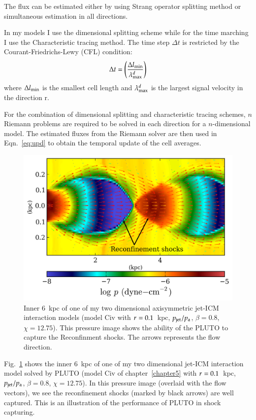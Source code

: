The flux can be estimated either by using Strang operator splitting method or simultaneous estimation in all directions. 

In my models I use the dimensional splitting scheme while for the time marching I use the Characteristic tracing method. The time step $\Delta t$ is restricted by the Courant-Friedrichs-Lewy (CFL) condition: 
\begin{equation}
\Delta t = \left ( \frac{\Delta l_{\rm min}}{\lambda_{\rm max}^d}\right )
\end{equation}
 where $\Delta l_{\rm min}$ is the smallest cell length and $\lambda_{\rm max}^d$ is the largest signal velocity in the direction r. 

For the combination of dimensional splitting and characteristic tracing schemes, $n$ Riemann problems are required to be solved in each direction for a $n$-dimensional model. The estimated fluxes from the Riemann solver are then used in Eqn.~\ref{eq:upd} to obtain the temporal update of the cell averages.  
\begin{figure}[h!]
\includegraphics{rsk.png}
\caption{Inner 6~kpc of one of my two dimensional axisymmetric jet-ICM interaction models (model Civ with $r_{\rm}=0.1$~kpc, $p_{\rm jet}/p_{\rm a}$, $\beta=0.8$, $\chi = 12.75$). This pressure image shows the ability of the PLUTO to capture the Reconfinment shocks. The arrows represents the flow direction. }
\label{f:rsk}
\end{figure}

Fig.~\ref{f:rsk} shows the inner 6~kpc of one of my two dimensional jet-ICM interaction model solved by PLUTO (model Civ of chapter~\ref{chapter5} with $r_{\rm}=0.1$~kpc, $p_{\rm jet}/p_{\rm a}$, $\beta=0.8$, $\chi = 12.75$). In this pressure image (overlaid with the flow vectors), we see the reconfinement shocks (marked by black arrows) are well captured. This is an illustration of the performance of PLUTO in shock capturing.  


